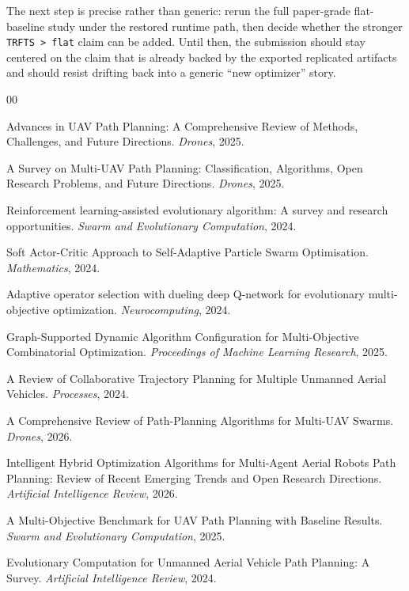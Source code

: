\documentclass[a4paper,fleqn]{cas-dc}
\begin{document}
The next step is precise rather than generic: rerun the full paper-grade flat-baseline study under the restored runtime path, then decide whether the stronger \texttt{TRFTS > flat} claim can be added. Until then, the submission should stay centered on the claim that is already backed by the exported replicated artifacts and should resist drifting back into a generic ``new optimizer'' story.

\begin{thebibliography}{00}

Advances in UAV Path Planning: A Comprehensive Review of Methods, Challenges, and Future Directions.
\textit{Drones}, 2025.

A Survey on Multi-UAV Path Planning: Classification, Algorithms, Open Research Problems, and Future Directions.
\textit{Drones}, 2025.

Reinforcement learning-assisted evolutionary algorithm: A survey and research opportunities.
\textit{Swarm and Evolutionary Computation}, 2024.

Soft Actor-Critic Approach to Self-Adaptive Particle Swarm Optimisation.
\textit{Mathematics}, 2024.

Adaptive operator selection with dueling deep Q-network for evolutionary multi-objective optimization.
\textit{Neurocomputing}, 2024.

Graph-Supported Dynamic Algorithm Configuration for Multi-Objective Combinatorial Optimization.
\textit{Proceedings of Machine Learning Research}, 2025.

A Review of Collaborative Trajectory Planning for Multiple Unmanned Aerial Vehicles.
\textit{Processes}, 2024.

A Comprehensive Review of Path-Planning Algorithms for Multi-UAV Swarms.
\textit{Drones}, 2026.

Intelligent Hybrid Optimization Algorithms for Multi-Agent Aerial Robots Path Planning: Review of Recent Emerging Trends and Open Research Directions.
\textit{Artificial Intelligence Review}, 2026.

A Multi-Objective Benchmark for UAV Path Planning with Baseline Results.
\textit{Swarm and Evolutionary Computation}, 2025.

Evolutionary Computation for Unmanned Aerial Vehicle Path Planning: A Survey.
\textit{Artificial Intelligence Review}, 2024.


\end{thebibliography}
\end{document}
